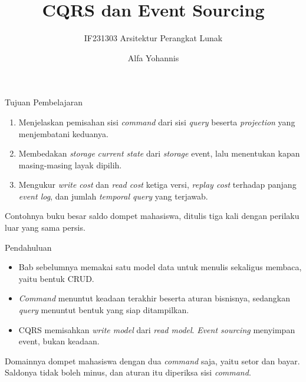 \documentclass[aspectratio=169, table, 12pt]{beamer}
\title{\Huge{CQRS dan Event Sourcing}}
\subtitle{IF231303 Arsitektur Perangkat Lunak}
\author{Alfa Yohannis}
\begin{document}
\frame{\titlepage}

\begin{frame}{{\Large Tujuan Pembelajaran}}
  \vspace{10pt}
  \begin{enumerate}
    \item Menjelaskan pemisahan sisi \textit{command} dari sisi \textit{query} beserta \textit{projection}
          yang menjembatani keduanya.
    \item Membedakan \textit{storage} \textit{current state} dari \textit{storage} event,
          lalu menentukan kapan masing-masing layak dipilih.
    \item Mengukur \textit{write cost} dan \textit{read cost} ketiga versi,
          \textit{replay cost} terhadap panjang \textit{event log}, dan jumlah
          \textit{temporal query} yang terjawab.
  \end{enumerate}

  \vspace{10pt}
  {\small Contohnya buku besar saldo dompet mahasiswa, ditulis tiga kali dengan
  perilaku luar yang sama persis.}
\end{frame}

\begin{frame}{{\Large Pendahuluan}}
  \vspace{8pt}
  \begin{itemize}\small
    \item Bab sebelumnya memakai satu model data untuk menulis sekaligus
          membaca, yaitu bentuk CRUD.
    \item \textit{Command} menuntut keadaan terakhir beserta aturan bisnisnya, sedangkan
          \textit{query} menuntut bentuk yang siap ditampilkan.
    \item CQRS memisahkan \textit{write model} dari \textit{read model}. \textit{Event sourcing}
          menyimpan event, bukan keadaan.
  \end{itemize}

  \vspace{8pt}
  {\small Domainnya dompet mahasiswa dengan dua \textit{command} saja, yaitu setor dan
  bayar. Saldonya tidak boleh minus, dan aturan itu diperiksa sisi \textit{command}.}
\end{frame}
\end{document}

